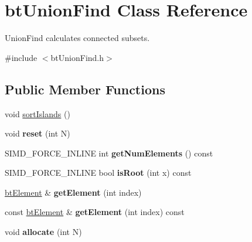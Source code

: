\hypertarget{classbtUnionFind}{}\section{bt\+Union\+Find Class Reference}
\label{classbtUnionFind}


Union\+Find calculates connected subsets.  




{\ttfamily \#include $<$bt\+Union\+Find.\+h$>$}

\subsection*{Public Member Functions}
\begin{DoxyCompactItemize}
\item 
void \hyperlink{classbtUnionFind_a8bf4647f84d20b033e0d0a7188f3b798}{sort\+Islands} ()
\item 
\mbox{\label{classbtUnionFind_a2c0b1e855d522d3993fc5ba98dc8b1d4}} 
void {\bfseries reset} (int N)
\item 
\mbox{\label{classbtUnionFind_a77445a4744996039b1ab939b165b7765}} 
S\+I\+M\+D\+\_\+\+F\+O\+R\+C\+E\+\_\+\+I\+N\+L\+I\+NE int {\bfseries get\+Num\+Elements} () const
\item 
\mbox{\label{classbtUnionFind_aff344ac3713bb52baf65b3720ad2a7c0}} 
S\+I\+M\+D\+\_\+\+F\+O\+R\+C\+E\+\_\+\+I\+N\+L\+I\+NE bool {\bfseries is\+Root} (int x) const
\item 
\mbox{\label{classbtUnionFind_ab9c9ac633e6a3a43f90da29845b92bd3}} 
\hyperlink{structbtElement}{bt\+Element} \& {\bfseries get\+Element} (int index)
\item 
\mbox{\label{classbtUnionFind_a42a543d6400ed5833fc817ce8ab559f2}} 
const \hyperlink{structbtElement}{bt\+Element} \& {\bfseries get\+Element} (int index) const
\item 
\mbox{\label{classbtUnionFind_a4d4e2f8ef29c5f86f693d2340a5c377b}} 
void {\bfseries allocate} (int N)
\item 
\mbox{\label{classbtUnionFind_a4acdd17f2aa73146b25731caff4d0e86}} 

\end{DoxyCompactItemize}
